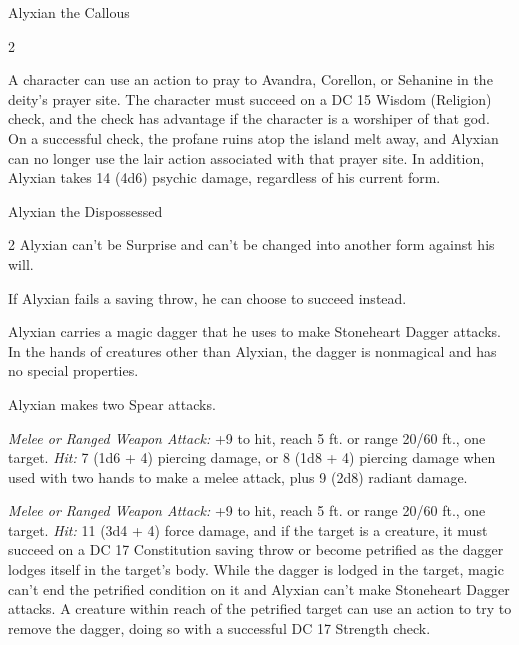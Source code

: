\documentclass[10pt,a4paper,twoside,fancy,bg=print,twocolumn,openany,nodeprecatedcode]{dndbook}
\begin{document}
\begin{DndMonster}[float*=b,width=\textwidth + 8pt]{Alyxian the Callous}
\begin{multicols}{2}
\begin{description}
\end{description}

A character can use an action to pray to Avandra, Corellon, or Sehanine in the deity's prayer site. The character must succeed on a DC 15 Wisdom (Religion) check, and the check has advantage if the character is a worshiper of that god. On a successful check, the profane ruins atop the island melt away, and Alyxian can no longer use the lair action associated with that prayer site. In addition, Alyxian takes 14 (4d6) psychic damage, regardless of his current form.

\end{multicols}
\end{DndMonster}



\begin{DndMonster}[float*=b,width=\textwidth + 8pt]{Alyxian the Dispossessed}
\begin{multicols}{2}
\DndMonsterBasics[
armor-class = {15 (\textit{leather armor})},
hit-points = {\DndDice{18d8 + 72}},
speed = {30 ft.}
]
\DndMonsterAbilityScores[
 str = 19,
 dex = 15,
 con = 18,
 int = 13,
 wis = 14,
 cha = 20
]
\DndMonsterDetails[
saving-throws = {Str +9, Con +9, Wis +7},
skills = {Insight +7, Perception +7, Persuasion +10},
senses = {darkvision 120 ft., passive perception 17},
languages = {Celestial, Common, Elvish, telepathy 120 ft.},
challenge = 13,
]
Alyxian can't be Surprise and can't be changed into another form against his will.

If Alyxian fails a saving throw, he can choose to succeed instead.

Alyxian carries a magic dagger that he uses to make Stoneheart Dagger attacks. In the hands of creatures other than Alyxian, the dagger is nonmagical and has no special properties.

Alyxian makes two Spear attacks.

\textsl{Melee or Ranged Weapon Attack:} +9 to hit, reach 5 ft. or range 20/60 ft., one target. \textsl{Hit:} 7 (1d6 + 4) piercing damage, or 8 (1d8 + 4) piercing damage when used with two hands to make a melee attack, plus 9 (2d8) radiant damage.

\textsl{Melee or Ranged Weapon Attack:} +9 to hit, reach 5 ft. or range 20/60 ft., one target. \textsl{Hit:} 11 (3d4 + 4) force damage, and if the target is a creature, it must succeed on a DC 17 Constitution saving throw or become petrified as the dagger lodges itself in the target's body. While the dagger is lodged in the target, magic can't end the petrified condition on it and Alyxian can't make Stoneheart Dagger attacks. A creature within reach of the petrified target can use an action to try to remove the dagger, doing so with a successful DC 17 Strength check.


\end{multicols}
\end{DndMonster}
\end{document}
